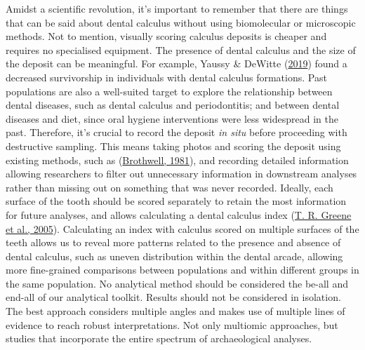 \documentclass[
  letterpaper,
]{book}
\begin{document}
Amidst a scientific revolution, it's important to remember that there
are things that can be said about dental calculus without using
biomolecular or microscopic methods. Not to mention, visually scoring
calculus deposits is cheaper and requires no specialised equipment. The
presence of dental calculus and the size of the deposit can be
meaningful. For example, Yaussy \& DeWitte
(\protect\hyperlink{ref-yaussyCalculusSurvivorship2019}{2019}) found a
decreased survivorship in individuals with dental calculus formations.
Past populations are also a well-suited target to explore the
relationship between dental diseases, such as dental calculus and
periodontitis; and between dental diseases and diet, since oral hygiene
interventions were less widespread in the past. Therefore, it's crucial
to record the deposit \emph{in situ} before proceeding with destructive
sampling. This means taking photos and scoring the deposit using
existing methods, such as
(\protect\hyperlink{ref-brothwellDiggingBones1981}{Brothwell, 1981}),
and recording detailed information allowing researchers to filter out
unnecessary information in downstream analyses rather than missing out
on something that was never recorded. Ideally, each surface of the tooth
should be scored separately to retain the most information for future
analyses, and allows calculating a dental calculus index
(\protect\hyperlink{ref-greeneQuantifyingCalculus2005}{T. R. Greene et
al., 2005}). Calculating an index with calculus scored on multiple
surfaces of the teeth allows us to reveal more patterns related to the
presence and absence of dental calculus, such as uneven distribution
within the dental arcade, allowing more fine-grained comparisons between
populations and within different groups in the same population. No
analytical method should be considered the be-all and end-all of our
analytical toolkit. Results should not be considered in isolation. The
best approach considers multiple angles and makes use of multiple lines
of evidence to reach robust interpretations. Not only multiomic
approaches, but studies that incorporate the entire spectrum of
archaeological analyses.
\end{document}
